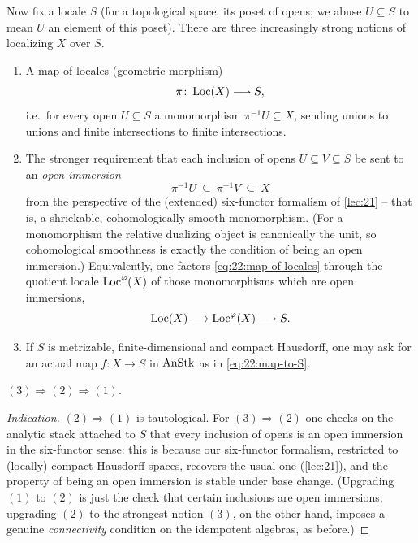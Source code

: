 Now fix a locale $S$ (for a topological space, its poset of opens; we abuse
$U\subseteq S$ to mean $U$ an element of this poset). There are three
increasingly strong notions of localizing $X$ over $S$.
\begin{enumerate}
\item A map of locales (geometric morphism)
\begin{equation}
\label{eq:22:map-of-locales}
\pi\colon \operatorname{Loc}(X)\longrightarrow S ,
\end{equation}
i.e.\ for every open $U\subseteq S$ a monomorphism $\pi^{-1}U\subseteq X$,
sending unions to unions and finite intersections to finite intersections.
\item The stronger requirement that each inclusion of opens $U\subseteq V
\subseteq S$ be sent to an \emph{open immersion}
\begin{equation*}
\pi^{-1}U\ \subseteq\ \pi^{-1}V\ \subseteq\ X
\end{equation*}
from the perspective of the (extended) six-functor formalism of \cref{lec:21}
-- that is, a shriekable, cohomologically smooth monomorphism. (For a
monomorphism the relative dualizing object is canonically the unit, so
cohomological smoothness is exactly the condition of being an open immersion.)
Equivalently, one factors \eqref{eq:22:map-of-locales} through the quotient
locale $\operatorname{Loc}^{\varphi}(X)$ of those monomorphisms which are open immersions,
\begin{equation}
\label{eq:22:factor-through-phi}
\operatorname{Loc}(X)\longrightarrow \operatorname{Loc}^{\varphi}(X)\longrightarrow S .
\end{equation}
\item If $S$ is metrizable, finite-dimensional and compact Hausdorff, one may
ask for an actual map $f\colon X\to S$ in $\operatorname{AnStk}$ as in
\eqref{eq:22:map-to-S}.
\end{enumerate}

\begin{proposition}
\label{prop:22:implications}
$(3)\Rightarrow(2)\Rightarrow(1)$.
\end{proposition}

\begin{proof}[Indication]
$(2)\Rightarrow(1)$ is tautological. For $(3)\Rightarrow(2)$ one checks on the
analytic stack attached to $S$ that every inclusion of opens is an open
immersion in the six-functor sense: this is because our six-functor formalism,
restricted to (locally) compact Hausdorff spaces, recovers the usual one
(\cref{lec:21}), and the property of being an open immersion is stable under
base change. (Upgrading $(1)$ to $(2)$ is just the check that certain inclusions
are open immersions; upgrading $(2)$ to the strongest notion $(3)$, on the other
hand, imposes a genuine \emph{connectivity} condition on the idempotent algebras,
as before.)
\end{proof}

